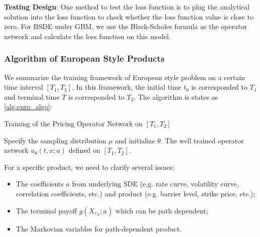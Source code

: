 \documentclass[11pt,a4paper]{article}
\theoremstyle{remark}
\begin{document}
	\noindent \textbf{Testing Design}: One method to test the loss function is to plug the analytical solution into the loss function to check whether the loss function value is close to zero. For BSDE under GBM, we use the Black-Scholes formula as the operator network and calculate the loss function on this model.
	
	
	
	\subsubsection{Algorithm of European Style Products} \label{sec:euro}
	We summarize the training framework of European style problem on a certain time interval $[T_1, T_2]$. In this framework, the initial time $t_0$ is corresponded to $T_1$ and terminal time $T$ is corresponded to $T_2$. The algorithm is states as \ref{alg:euro_algo}:	
	\begin{algorithm} [htbp!]
		\begin{algorithmic}[htbp!] 
			\caption{Training of the Pricing Operator Network on $[T_1, T_2]$}\label{alg:euro_algo}
			\STATE Specify the sampling distribution $\mu$ and initialize $\theta$.
			\ENDFOR
			\RETURN  The well trained operator network $u_{\theta}(t, x; a)$ defined on $[T_1, T_2]$.
		\end{algorithmic}
	\end{algorithm}
	
	\noindent For a specific product, we need to clarify several issues:
	\begin{itemize}
		\item The coefficients $a$ from underlying SDE (e.g. rate curve, volatility curve, correlation coefficients, etc.) and  product (e.g. barrier level, strike price, etc.); 
		\item The terminal payoff $g(X_{\tau_N}; a)$ which can be path dependent; 
		\item The Markovian variables for path-dependent product.
	\end{itemize}
	
\end{document}
